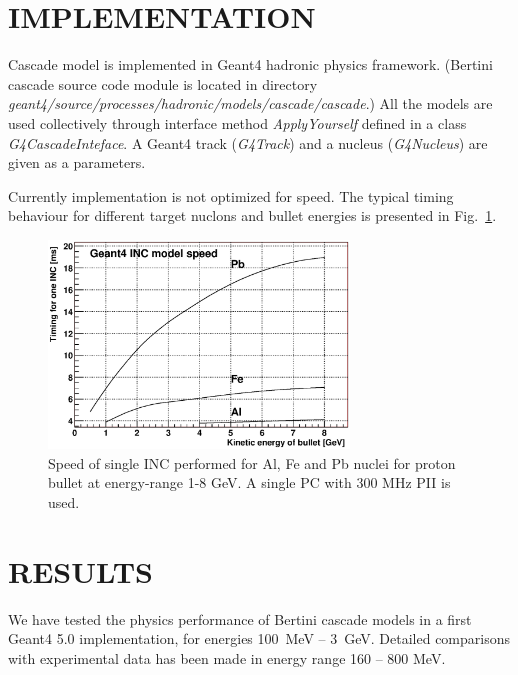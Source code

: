 \documentclass[twocolumn,twoside,slac]{revtex4}
\begin{document}




\section{IMPLEMENTATION}


Cascade model is implemented in Geant4 hadronic physics framework. (Bertini cascade source code module is located in directory {\it geant4/\-source/\-processes/\-hadronic/\-models/\-cascade/\-cascade}.)
All the models are used collectively through interface method {\it Apply\-Yourself} defined in a class {\it G4Cascade\-Inteface}.
A Geant4 track  ({\it G4Track}) and a nucleus ({\it G4Nucleus}) are given as a parameters.


Currently implementation is not optimized for speed.
The typical timing behaviour for different target nuclons and bullet energies is presented in Fig.~\ref{timingModel}.

\begin{figure}
  \includegraphics[width=80mm,keepaspectratio]{tIsotopeVsEnergy.eps}
  \caption{Speed of single INC performed for Al, Fe and Pb nuclei for proton bullet at energy-range 1-8 GeV.
A single PC with 300 MHz PII is used.}
  \label{timingModel}
\end{figure}

\section{RESULTS}
\label{results}

We have tested the physics performance of Bertini cascade models in a first Geant4 5.0 implementation, for energies 100~MeV -- 3~GeV. 
Detailed comparisons with experimental data has been made in energy range 160 -- 800 MeV.
 
\end{document}

